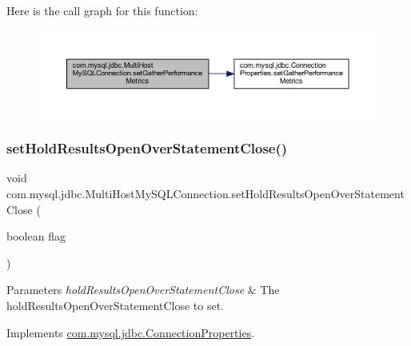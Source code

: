Here is the call graph for this function\+:
\nopagebreak
\begin{figure}[H]
\begin{center}
\leavevmode
\includegraphics[width=350pt]{classcom_1_1mysql_1_1jdbc_1_1_multi_host_my_s_q_l_connection_a06b568a697c11663a400405c5c8998cb_cgraph}
\end{center}
\end{figure}
\mbox{\label{classcom_1_1mysql_1_1jdbc_1_1_multi_host_my_s_q_l_connection_a12b7bd6460f769ac0ef7b34c7fbc9808}} 
\subsubsection{\texorpdfstring{set\+Hold\+Results\+Open\+Over\+Statement\+Close()}{setHoldResultsOpenOverStatementClose()}}
{\footnotesize\ttfamily void com.\+mysql.\+jdbc.\+Multi\+Host\+My\+S\+Q\+L\+Connection.\+set\+Hold\+Results\+Open\+Over\+Statement\+Close (\begin{DoxyParamCaption}\item[{boolean}]{flag }\end{DoxyParamCaption})}


\begin{DoxyParams}{Parameters}
{\em hold\+Results\+Open\+Over\+Statement\+Close} & The hold\+Results\+Open\+Over\+Statement\+Close to set. \\
\hline
\end{DoxyParams}


Implements \mbox{\hyperlink{interfacecom_1_1mysql_1_1jdbc_1_1_connection_properties_a9447a03edd2efdd020960e0a12d22aa7}{com.\+mysql.\+jdbc.\+Connection\+Properties}}.


